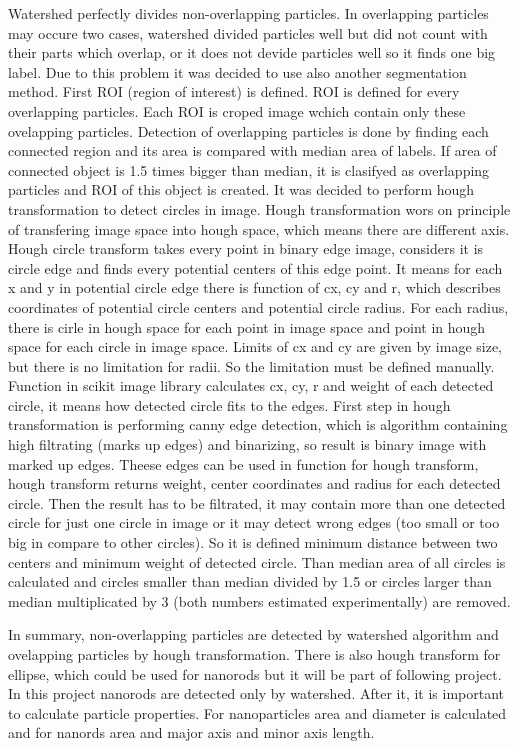 Watershed perfectly divides non-overlapping particles. In overlapping particles may occure
two cases, watershed divided particles well but did not count with their parts which
overlap, or it does not devide particles well so it finds one big label. Due to this
problem it was decided to use also another segmentation method. First ROI (region of
interest) is defined. ROI is defined for every overlapping particles. Each ROI is
croped image wchich contain only these ovelapping particles. Detection of overlapping
particles is done by finding each connected region and its area is compared with
median area of labels. If area of connected object is 1.5 times bigger than median,
it is clasifyed as overlapping particles and ROI of this object is created.
It was decided to perform hough transformation to detect circles in image. Hough
transformation wors on principle of transfering image space into hough space, which means
there are different axis. Hough circle transform takes every point in binary edge image,
considers it is circle edge and finds every potential centers of this edge point.
It means for each x and y in potential circle edge there is function of cx, cy and r,
which describes coordinates of potential circle centers and potential circle radius.
For each radius, there is cirle in hough space for each point in image space and
point in hough space for each circle in image space. Limits of cx and cy are given by
image size, but there is no limitation for radii. So the limitation must be defined
manually. Function in scikit image library calculates cx, cy, r and weight of each
detected circle, it means how detected circle fits to the edges. First step in hough
transformation is performing canny edge detection, which is algorithm containing
high filtrating (marks up edges) and binarizing, so result is binary image with marked
up edges. Theese edges can be used in function for hough transform, hough transform
returns weight, center coordinates and radius for each detected circle. Then the result
has to be filtrated, it may contain more than one detected circle for just one circle in
image or it may detect wrong edges (too small or too big in compare to other circles).
So it is defined minimum distance between two centers and minimum weight of detected circle.
Than median area of all circles is calculated and circles smaller than median divided by
1.5 or circles larger than median multiplicated by 3 (both numbers estimated experimentally)
are removed.

In summary, non-overlapping particles are detected by watershed algorithm and ovelapping
particles by hough transformation. There is also hough transform for ellipse, which could
be used for nanorods but it will be part of following project. In this project nanorods are
detected only by watershed. After it, it is important to calculate particle properties.
For nanoparticles area and diameter is calculated and for nanords area and major axis and
minor axis length.
